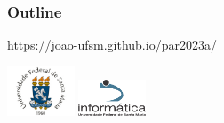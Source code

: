 \documentclass[xcolor={usenames,dvipsnames},10pt,compress]{beamer}
\title[\titulo]{\titulo}
\subtitle{\disciplina}
\author[João V. F. Lima]{\nome}
\institute[UFSM]{Universidade Federal de Santa Maria \\ \url{jvlima@inf.ufsm.br} \\ \url{http://www.inf.ufsm.br/~jvlima}}
\date{2023/1}
\begin{document}
\begin{frame}
  \maketitle
\end{frame}

\begin{frame}
    \frametitle{Outline}
    \tableofcontents[hideallsubsections]
\end{frame}


%
%


%
%
%
%


\begin{frame}[plain]{}
  \begin{center}
    \vspace{2cm}
    \Large{https://joao-ufsm.github.io/par2023a/}
    
    \vspace{1cm}
    \includegraphics[width=2cm]{logo_ufsm}
    \hspace{0.5cm}
    \includegraphics[width=2cm]{logo_inf}
  \end{center}
\end{frame}
\end{document}
